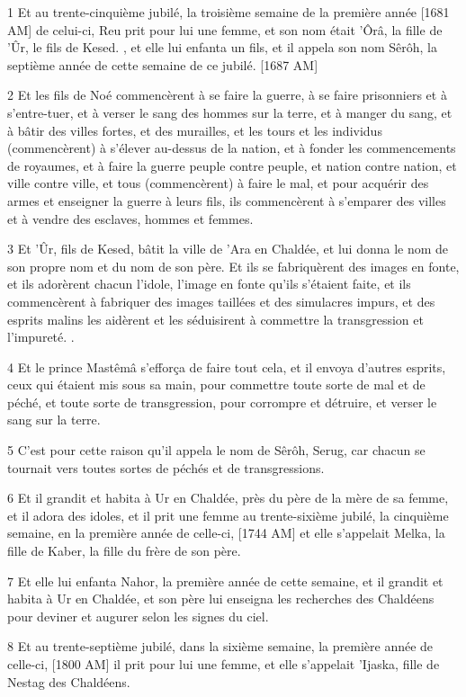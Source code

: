 \par 1 Et au trente-cinquième jubilé, la troisième semaine de la première année [1681 AM] de celui-ci, Reu prit pour lui une femme, et son nom était 'Ôrâ, la fille de 'Ûr, le fils de Kesed. , et elle lui enfanta un fils, et il appela son nom Sêrôh, la septième année de cette semaine de ce jubilé. [1687 AM]
\par 2 Et les fils de Noé commencèrent à se faire la guerre, à se faire prisonniers et à s'entre-tuer, et à verser le sang des hommes sur la terre, et à manger du sang, et à bâtir des villes fortes, et des murailles, et les tours et les individus (commencèrent) à s'élever au-dessus de la nation, et à fonder les commencements de royaumes, et à faire la guerre peuple contre peuple, et nation contre nation, et ville contre ville, et tous (commencèrent) à faire le mal, et pour acquérir des armes et enseigner la guerre à leurs fils, ils commencèrent à s'emparer des villes et à vendre des esclaves, hommes et femmes.
\par 3 Et 'Ûr, fils de Kesed, bâtit la ville de 'Ara en Chaldée, et lui donna le nom de son propre nom et du nom de son père. Et ils se fabriquèrent des images en fonte, et ils adorèrent chacun l'idole, l'image en fonte qu'ils s'étaient faite, et ils commencèrent à fabriquer des images taillées et des simulacres impurs, et des esprits malins les aidèrent et les séduisirent à commettre la transgression et l'impureté. .
\par 4 Et le prince Mastêmâ s'efforça de faire tout cela, et il envoya d'autres esprits, ceux qui étaient mis sous sa main, pour commettre toute sorte de mal et de péché, et toute sorte de transgression, pour corrompre et détruire, et verser le sang sur la terre.
\par 5 C'est pour cette raison qu'il appela le nom de Sêrôh, Serug, car chacun se tournait vers toutes sortes de péchés et de transgressions.
\par 6 Et il grandit et habita à Ur en Chaldée, près du père de la mère de sa femme, et il adora des idoles, et il prit une femme au trente-sixième jubilé, la cinquième semaine, en la première année de celle-ci, [1744 AM] et elle s'appelait Melka, la fille de Kaber, la fille du frère de son père.
\par 7 Et elle lui enfanta Nahor, la première année de cette semaine, et il grandit et habita à Ur en Chaldée, et son père lui enseigna les recherches des Chaldéens pour deviner et augurer selon les signes du ciel.
\par 8 Et au trente-septième jubilé, dans la sixième semaine, la première année de celle-ci, [1800 AM] il prit pour lui une femme, et elle s'appelait 'Ijaska, fille de Nestag des Chaldéens.
